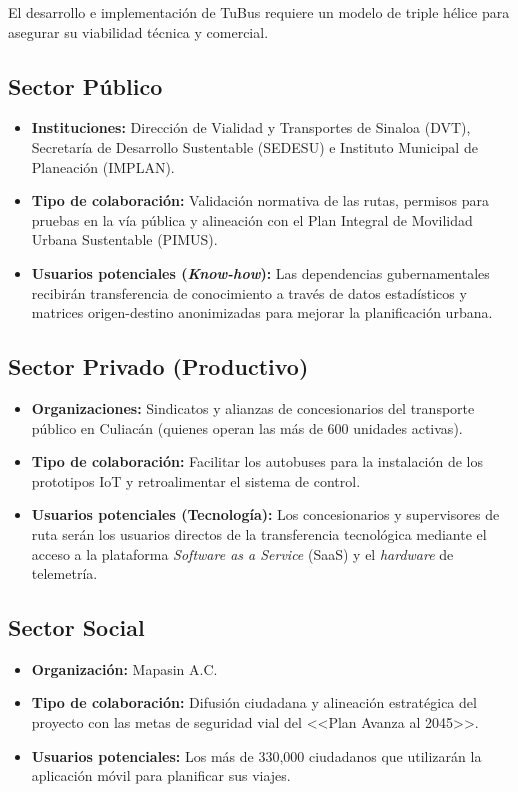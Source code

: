 \documentclass[12pt,letterpaper]{article}
\begin{document}
El desarrollo e implementación de TuBus requiere un modelo de triple hélice
para asegurar su viabilidad técnica y comercial.

\subsection*{Sector Público}
\begin{itemize}[leftmargin=*]
  \item \textbf{Instituciones:} Dirección de Vialidad y Transportes de Sinaloa
    (DVT), Secretaría de Desarrollo Sustentable (SEDESU) e Instituto Municipal
    de Planeación (IMPLAN).
  \item \textbf{Tipo de colaboración:} Validación normativa de las rutas,
    permisos para pruebas en la vía pública y alineación con el Plan Integral de
    Movilidad Urbana Sustentable (PIMUS).
  \item \textbf{Usuarios potenciales (\textit{Know-how}):} Las dependencias
    gubernamentales recibirán transferencia de conocimiento a través de datos
    estadísticos y matrices origen-destino anonimizadas para mejorar la
    planificación urbana.
\end{itemize}

\subsection*{Sector Privado (Productivo)}
\begin{itemize}[leftmargin=*]
  \item \textbf{Organizaciones:} Sindicatos y alianzas de concesionarios del
    transporte público en Culiacán (quienes operan las más de 600 unidades
    activas).
  \item \textbf{Tipo de colaboración:} Facilitar los autobuses para la
    instalación de los prototipos IoT y retroalimentar el sistema de control.
  \item \textbf{Usuarios potenciales (Tecnología):} Los concesionarios y
    supervisores de ruta serán los usuarios directos de la transferencia
    tecnológica mediante el acceso a la plataforma \textit{Software as a
    Service} (SaaS) y el \textit{hardware} de telemetría.
\end{itemize}

\subsection*{Sector Social}
\begin{itemize}[leftmargin=*]
  \item \textbf{Organización:} Mapasin A.C.
  \item \textbf{Tipo de colaboración:} Difusión ciudadana y alineación
    estratégica del proyecto con las metas de seguridad vial del <<Plan Avanza
    al 2045>>.
  \item \textbf{Usuarios potenciales:} Los más de 330,000 ciudadanos que
    utilizarán la aplicación móvil para planificar sus viajes.
\end{itemize}
\end{document}
